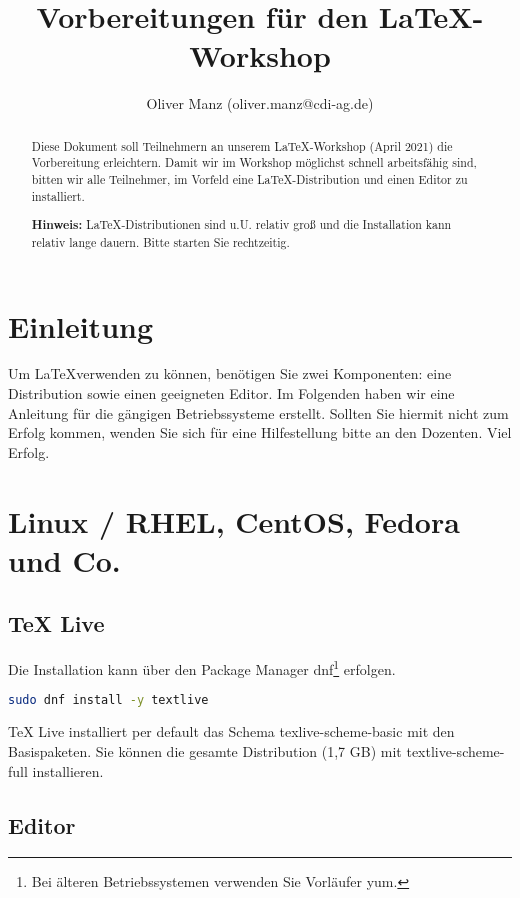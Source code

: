 \documentclass[a4paper,10pt]{article}
\title{Vorbereitungen für den \LaTeX -Workshop}
\author{Oliver Manz (oliver.manz@cdi-ag.de)}
\begin{document}
\maketitle

\begin{abstract}

Diese Dokument soll Teilnehmern an unserem \LaTeX -Workshop (April 2021) die Vorbereitung erleichtern. Damit wir im Workshop möglichst schnell arbeitsfähig sind, bitten wir alle Teilnehmer, im Vorfeld eine LaTeX-Distribution und einen Editor zu installiert.
\par
\textbf{Hinweis:} \LaTeX -Distributionen sind u.U. relativ groß und die Installation kann relativ lange dauern. Bitte starten Sie rechtzeitig.

\end{abstract}

\section{Einleitung}
Um \LaTeX verwenden zu können, benötigen Sie zwei Komponenten: eine Distribution sowie einen geeigneten Editor. Im Folgenden haben wir eine Anleitung für die gängigen Betriebssysteme erstellt. Sollten Sie hiermit nicht zum Erfolg kommen, wenden Sie sich für eine Hilfestellung bitte an den Dozenten. Viel Erfolg.

\section{Linux / RHEL, CentOS, Fedora und Co.}
\label{rhel}
\subsection{TeX Live}
Die Installation kann über den Package Manager dnf\footnote{Bei älteren Betriebssystemen verwenden Sie Vorläufer yum.} erfolgen.

\begin{lstlisting}[language=bash]
sudo dnf install -y textlive
\end{lstlisting}

TeX Live installiert per default das Schema texlive-scheme-basic mit den Basispaketen. Sie können die gesamte Distribution (1,7 GB) mit textlive-scheme-full installieren. 

\subsection{Editor}
\end{document}
